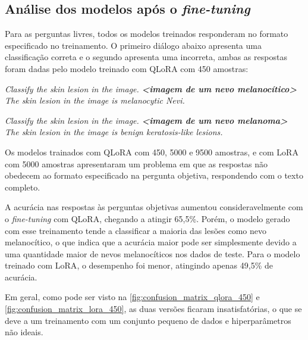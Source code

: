 \subsection{Análise dos modelos após o \textit{fine-tuning}}

Para as perguntas livres, todos os modelos treinados responderam no formato especificado no treinamento. O primeiro diálogo abaixo apresenta uma classificação correta e
o segundo apresenta uma incorreta, ambas as respostas foram dadas pelo modelo treinado com \ac{QLoRA} com 450 amostras:

\begin{dialogue}
     \textit{Classify the skin lesion in the image. \textbf{<imagem de um nevo melanocítico>}} \\
     \textit{The skin lesion in the image is melanocytic Nevi.}
\end{dialogue}

\begin{dialogue}
     \textit{Classify the skin lesion in the image. \textbf{<imagem de um nevo melanoma>}} \\
     \textit{The skin lesion in the image is benign keratosis-like lesions.}
\end{dialogue}

Os modelos trainados com \ac{QLoRA} com 450, 5000 e 9500 amostras, e com \ac{LoRA} com 5000 amostras apresentaram um problema em que as respostas não obedecem ao formato
especificado na pergunta objetiva, respondendo com o texto completo.

A acurácia nas respostas às perguntas objetivas aumentou consideravelmente com o \textit{fine-tuning} com \ac{QLoRA}, chegando a atingir 65,5\%. Porém, o modelo gerado
com esse treinamento tende a classificar a maioria das lesões como nevo melanocítico, o que indica que a acurácia maior pode ser simplesmente devido a uma quantidade
maior de nevos melanocíticos nos dados de teste. Para o modelo treinado com \ac{LoRA}, o desempenho foi menor, atingindo apenas 49,5\% de acurácia.

Em geral, como pode ser visto na \autoref{fig:confusion_matrix_qlora_450} e \autoref{fig:confusion_matrix_lora_450}, as duas versões ficaram insatisfatórias, o que se
deve a um treinamento com um conjunto pequeno de dados e hiperparâmetros não ideais.

